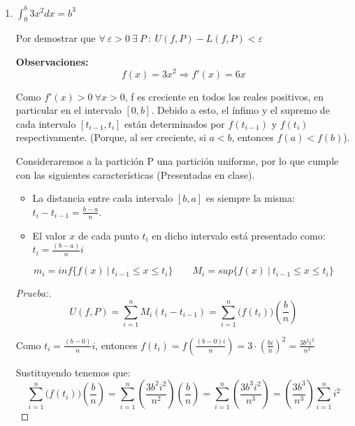 \documentclass[12pt]{article}
\begin{document}
\begin{enumerate}[\hspace{9px} a)]
\begin{proof}[Prueba:]
            \[sup\{L(f,P)\}=inf\{U(f,P)\}=\frac{b^3}{6}\]

            \textbf{$\therefore \ f$ es integrable en [0,b] y} \(\displaystyle\int_{0}^{b}\frac{x^2}{2}dx=\frac{b^3}{6}\)
        \end{proof}

    \item \(\displaystyle\int_{0}^{b}3x^2dx=b^3\)\medskip

        Por demostrar que \(\forall \ \varepsilon>0 \ \exists \ P \ : \ U(f,P)-L(f,P)<\varepsilon\)\medskip

        \textbf{Observaciones:}
        \[f(x)=3x^2 \Rightarrow f'(x)=6x\]

        Como \(f'(x)>0 \ \forall x>0\), f es creciente en todos los reales positivos, en particular en el intervalo $[0,b]$. Debido a esto, el \'infimo y el supremo de cada intervalo \([t_{i-1},t_i]\) est\'an determinados por \(f(t_{i-1})\) y \(f(t_i)\) respectivamente. (Porque, al ser creciente, si $a<b$, entonces \(f(a)<f(b)\)).\medskip

        Consideraremos a la partici\'on P una partici\'on uniforme, por lo que cumple con las siguientes caracter\'isticas (Presentadas en clase).
        \begin{itemize}
            \item La distancia entre cada intervalo $[b,a]$ es siempre la misma: \(t_i-t_{i-1}=\displaystyle\frac{b-a}{n}\).
            \item El valor $x$ de cada punto $t_i$ en dicho intervalo est\'a presentado como: \(t_i=\displaystyle\frac{(b-a)}{n}i\)
        \end{itemize}

        \[m_i=inf\{f(x) \ | \ t_{i-1} \leq x \leq t_i\} \qquad M_i=sup\{f(x) \ | \ t_{i-1} \leq x \leq t_i\}\]

        \begin{proof}[Prueba:]
            \begin{equation*}%
                U(f,P)=\sum_{i=1}^n M_i(t_i-t_{i-1}) = \sum_{i=1}^n \big(f(t_i)\big)\left(\displaystyle\frac{b}{n}\right)
            \end{equation*}

            Como \(t_i=\displaystyle\frac{(b-0)}{n}i\), entonces \(f(t_i)=f\left(\displaystyle\frac{(b-0)i}{n}\right) = 3\cdot\left(\frac{bi}{n}\right)^2 = \frac{3b^2i^2}{n^2}\)

            Sustituyendo tenemos que:
            \begin{equation*}
                \sum_{i=1}^n \big(f(t_i)\big)\left(\displaystyle\frac{b}{n}\right) = \sum_{i=1}^n \left(\frac{3b^2i^2}{n^2}\right)\left(\displaystyle\frac{b}{n}\right) = \sum_{i=1}^n \left(\frac{3b^3i^2}{n^3}\right) = \left(\frac{3b^3}{n^3}\right) \sum_{i=1}^n i^2
            \end{equation*}


\end{proof}
\end{enumerate}
\end{document}
